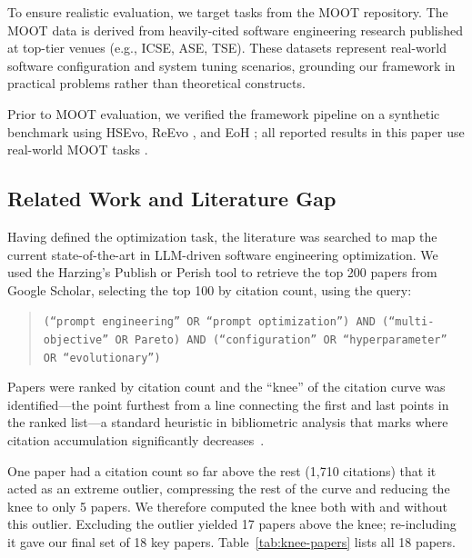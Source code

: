 \documentclass[sigconf,nonacm]{acmart}
\begin{document}
To ensure realistic evaluation, we target tasks from the MOOT repository. The MOOT data is derived from heavily-cited software engineering research published at top-tier venues (e.g., ICSE, ASE, TSE). These datasets represent real-world software configuration and system tuning scenarios, grounding our framework in practical problems rather than theoretical constructs.

Prior to MOOT evaluation, we verified the framework pipeline on a synthetic benchmark using HSEvo, ReEvo \cite{reevo2024}, and EoH \cite{eoh2024}; all reported results in this paper use real-world MOOT tasks \cite{menzies2024moot}.

\subsection{Related Work and Literature Gap}

Having defined the optimization task, the literature was searched to map the current state-of-the-art in LLM-driven software engineering optimization. We used the Harzing's Publish or Perish tool to retrieve the top 200 papers from Google Scholar, selecting the top 100 by citation count, using the query:

\begin{quote}
\texttt{(``prompt engineering'' OR ``prompt optimization'') AND (``multi-objective'' OR Pareto) AND (``configuration'' OR ``hyperparameter'' OR ``evolutionary'')}
\end{quote}

Papers were ranked by citation count and the ``knee'' of the citation curve was identified---the point furthest from a line connecting the first and last points in the ranked list---a standard heuristic in bibliometric analysis that marks where citation accumulation significantly decreases~\cite{menzies2024moot}.

One paper had a citation count so far above the rest (1,710 citations) that it acted as an extreme outlier, compressing the rest of the curve and reducing the knee to only 5 papers. We therefore computed the knee both with and without this outlier. Excluding the outlier yielded 17 papers above the knee; re-including it gave our final set of 18 key papers. Table~\ref{tab:knee-papers} lists all 18 papers.
\end{document}
